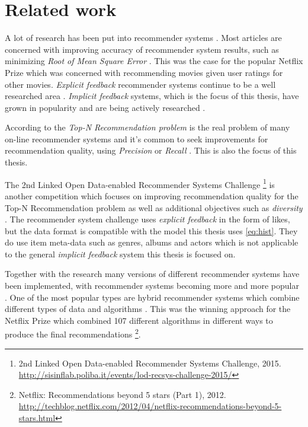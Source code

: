 \chapter{Related work}\label{cha:relwork}

A lot of research has been put into recommender systems \citep{bobadilla2013recommender}. Most articles are concerned with improving accuracy of recommender system results, such as minimizing \textit{Root of Mean Square Error} \prmse. This was the case for the popular Netflix Prize \citep{bennett2007netflix} which was concerned with recommending movies given user ratings for other movies. \textit{Explicit feedback} recommender systems continue to be a well researched area \citep{bobadilla2013recommender}. \textit{Implicit feedback} systems, which is the focus of this thesis, have grown in popularity and are being actively researched \citep{hu2008collaborative, bobadilla2013recommender}.

According to \citep{lai2012hybrid} the \textit{Top-N Recommendation problem} is the real problem of many on-line recommender systems and it's common to seek improvements for recommendation quality, using \textit{Precision} or \textit{Recall} \citep{bobadilla2013recommender}. This is also the focus of this thesis.

The 2nd Linked Open Data-enabled Recommender Systems Challenge
\footnote{2nd Linked Open Data-enabled Recommender Systems Challenge, 2015. \url{http://sisinflab.poliba.it/events/lod-recsys-challenge-2015/}}
is another competition which focuses on improving recommendation quality for the Top-N Recommendation problem as well as additional objectives such as \textit{diversity} \citep{bobadilla2013recommender}. The recommender system challenge uses \textit{explicit feedback} in the form of likes, but the data format is compatible with the model this thesis uses \eqref{eq:hist}. They do use item meta-data such as genres, albums and actors which is not applicable to the general \textit{implicit feedback} system this thesis is focused on.

Together with the research many versions of different recommender systems have been implemented, with recommender systems becoming more and more popular \citep{bobadilla2013recommender}. One of the most popular types are hybrid recommender systems which combine different types of data and algorithms \citep{bobadilla2013recommender, lai2012hybrid}. This was the winning approach for the Netflix Prize which combined 107 different algorithms in different ways to produce the final recommendations
\footnote{ Netflix: Recommendations beyond 5 stars (Part 1), 2012. \url{http://techblog.netflix.com/2012/04/netflix-recommendations-beyond-5-stars.html} }.

